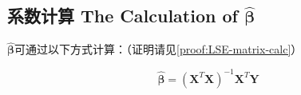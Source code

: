 \documentclass[UTF8]{ctexbook}
\begin{document}
\subsection{系数计算 The Calculation of $\boldsymbol{\hat\beta}$}
$\boldsymbol{\hat\beta}$可通过以下方式计算：（证明请见\ref{proof:LSE-matrix-calc}）

\[
	\boldsymbol{\hat\beta}=(\boldsymbol{X}^T\boldsymbol{X})^{-1}\boldsymbol{X}^T\boldsymbol{Y}
\]

%
%

%
%
%
\end{document}
